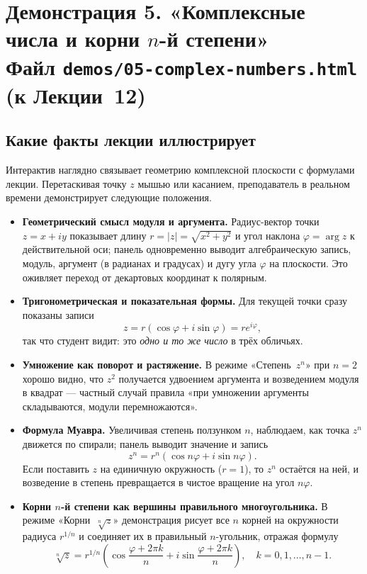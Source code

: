 \section*{Демонстрация 5. «Комплексные числа и корни \texorpdfstring{$n$}{n}-й степени»\\ \normalsize\textmd{Файл \texttt{demos/05-complex-numbers.html} \quad(к Лекции~12)}}

\subsection*{Какие факты лекции иллюстрирует}

Интерактив наглядно связывает геометрию комплексной плоскости с
формулами лекции. Перетаскивая точку $z$ мышью или касанием,
преподаватель в реальном времени демонстрирует следующие положения.

\begin{itemize}
  \item \textbf{Геометрический смысл модуля и аргумента.} Радиус-вектор
  точки $z = x + iy$ показывает длину $r = |z| = \sqrt{x^2 + y^2}$ и
  угол наклона $\varphi = \arg z$ к действительной оси; панель
  одновременно выводит алгебраическую запись, модуль, аргумент (в
  радианах и градусах) и дугу угла $\varphi$ на плоскости. Это оживляет
  переход от декартовых координат к полярным.

  \item \textbf{Тригонометрическая и показательная формы.} Для текущей
  точки сразу показаны записи
  \[
    z = r(\cos\varphi + i\sin\varphi) = r e^{i\varphi},
  \]
  так что студент видит: это \emph{одно и то же число} в трёх обличьях.

  \item \textbf{Умножение как поворот и растяжение.} В режиме
  «Степень~$z^n$» при $n = 2$ хорошо видно, что $z^2$ получается
  удвоением аргумента и возведением модуля в квадрат — частный случай
  правила «при умножении аргументы складываются, модули
  перемножаются».

  \item \textbf{Формула Муавра.} Увеличивая степень ползунком $n$,
  наблюдаем, как точка $z^n$ движется по спирали; панель выводит
  значение и запись
  \[
    z^n = r^n(\cos n\varphi + i\sin n\varphi).
  \]
  Если поставить $z$ на единичную окружность ($r = 1$), то $z^n$ остаётся
  на ней, и возведение в степень превращается в чистое вращение на угол
  $n\varphi$.

  \item \textbf{Корни $n$-й степени как вершины правильного
  многоугольника.} В режиме «Корни~$\sqrt[n]{z}$» демонстрация рисует
  все $n$ корней на окружности радиуса $r^{1/n}$ и соединяет их в
  правильный $n$-угольник, отражая формулу
  \[
    \sqrt[n]{z} = r^{1/n}\!\left(
      \cos\frac{\varphi + 2\pi k}{n} + i\sin\frac{\varphi + 2\pi k}{n}
    \right), \quad k = 0, 1, \dots, n-1.
  \]
\end{itemize}

